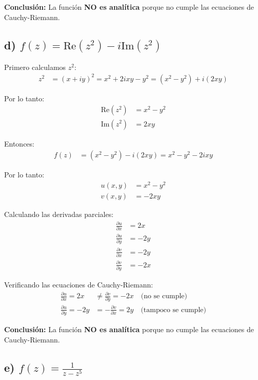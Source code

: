\documentclass{article}
\begin{document}
\textbf{Conclusión:} La función \textbf{NO es analítica} porque no cumple las ecuaciones de Cauchy-Riemann.

\subsection*{d) $f(z) = \text{Re}(z^2) - i\text{Im}(z^2)$}

Primero calculamos $z^2$:
\begin{align*}
z^2 &= (x + iy)^2 = x^2 + 2ixy - y^2 = (x^2 - y^2) + i(2xy)
\end{align*}

Por lo tanto:
\begin{align*}
\text{Re}(z^2) &= x^2 - y^2 \\
\text{Im}(z^2) &= 2xy
\end{align*}

Entonces:
\begin{align*}
f(z) &= (x^2 - y^2) - i(2xy) = x^2 - y^2 - 2ixy
\end{align*}

Por lo tanto:
\begin{align*}
u(x,y) &= x^2 - y^2 \\
v(x,y) &= -2xy
\end{align*}

Calculando las derivadas parciales:
\begin{align*}
\frac{\partial u}{\partial x} &= 2x \\
\frac{\partial u}{\partial y} &= -2y \\
\frac{\partial v}{\partial x} &= -2y \\
\frac{\partial v}{\partial y} &= -2x
\end{align*}

Verificando las ecuaciones de Cauchy-Riemann:
\begin{align*}
\frac{\partial u}{\partial x} = 2x &\neq \frac{\partial v}{\partial y} = -2x \quad \text{(no se cumple)} \\
\frac{\partial u}{\partial y} = -2y &= -\frac{\partial v}{\partial x} = 2y \quad \text{(tampoco se cumple)}
\end{align*}

\textbf{Conclusión:} La función \textbf{NO es analítica} porque no cumple las ecuaciones de Cauchy-Riemann.

\subsection*{e) $f(z) = \frac{1}{z - z^5}$}
\end{document}
